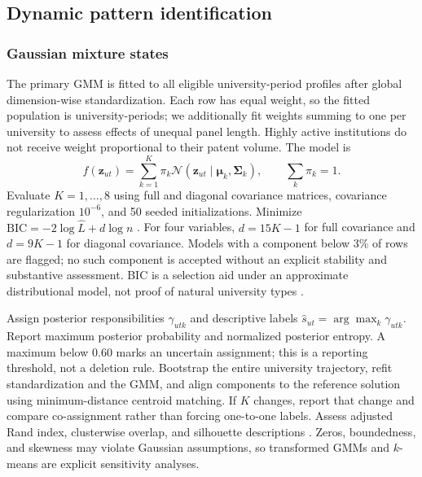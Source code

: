 \subsection{Dynamic pattern identification}\label{sec:patterns}
\subsubsection{Gaussian mixture states}
The primary GMM is fitted to all eligible university-period profiles after
global dimension-wise standardization. Each row has equal weight, so the fitted
population is university-periods; we additionally fit weights summing to one
per university to assess effects of unequal panel length. Highly active
institutions do not receive weight proportional to their patent volume.
The model is
\begin{equation}
 f(\mathbf{z}_{ut})=\sum_{k=1}^{K}\pi_k
 \mathcal{N}(\mathbf{z}_{ut}\mid\boldsymbol\mu_k,\boldsymbol\Sigma_k),
 \qquad \sum_k\pi_k=1.
 \label{eq:gmm}
\end{equation}
Evaluate $K=1,\ldots,8$ using full and diagonal covariance matrices, covariance
regularization $10^{-6}$, and 50 seeded initializations. Minimize
$\mathrm{BIC}=-2\log\widehat L+d\log n$ \citep{schwarz1978}.
For four variables, $d=15K-1$ for full covariance and $d=9K-1$ for diagonal
covariance. Models with a component below 3\% of rows are flagged; no such
component is accepted without an explicit stability and substantive assessment.
BIC is a selection aid under an approximate distributional model, not proof of
natural university types \citep{fraley2002,scrucca2016}.

Assign posterior responsibilities $\gamma_{utk}$ and descriptive labels
$\widehat s_{ut}=\arg\max_k\gamma_{utk}$. Report maximum posterior probability
and normalized posterior entropy. A maximum below 0.60 marks an uncertain
assignment; this is a reporting threshold, not a deletion rule. Bootstrap the
entire university trajectory, refit standardization and the GMM, and align
components to the reference solution using minimum-distance centroid matching.
If $K$ changes, report that change and compare co-assignment rather than forcing
one-to-one labels. Assess adjusted Rand index, clusterwise overlap, and
silhouette descriptions \citep{hubert1985,hennig2007,rousseeuw1987}. Zeros,
boundedness, and skewness may violate Gaussian assumptions, so transformed GMMs
and $k$-means are explicit sensitivity analyses.


